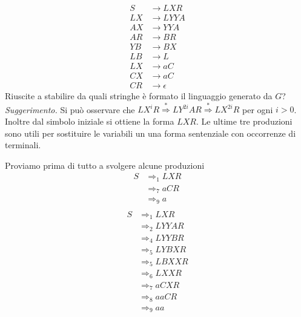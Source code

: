 \documentclass[12pt, answers]{exam}
\newcommand{\der}{\Rightarrow}
\begin{document}
\begin{questions}
	\begin{align}
		S &\rightarrow L X R \\
		L X &\rightarrow L Y Y A \\
		A X &\rightarrow Y Y A \\
		A R &\rightarrow B R \\
		Y B &\rightarrow B X \\
		L B &\rightarrow L \\
		L X &\rightarrow a C \\
		C X &\rightarrow a C \\
		C R &\rightarrow \epsilon
	\end{align}
	Riuscite a stabilire da quali stringhe è formato il linguaggio generato da $G$?
	\textit{Suggerimento.} Si può osservare che $L X^i R \overset{*}{\Rightarrow} LY^{2i} AR \overset{*}{\Rightarrow} LX^{2i} R$ per ogni $i > 0$. Inoltre dal simbolo iniziale si ottiene la forma $LXR$. Le ultime tre produzioni sono utili per sostituire le variabili un una forma sentenziale con occorrenze di terminali.
	\begin{solution}
		Proviamo prima di tutto a svolgere alcune produzioni
		\begin{align*}
			S &\der_1 L X R \\
			  &\der_7 a C R \\
			  &\der_9 a \\
		\end{align*}
		\begin{align*}
			S &\der_1 L X R \\
			  &\der_2 L Y Y A R \\
			  &\der_4 L Y Y B R \\
			  &\der_5 L Y B X R \\
			  &\der_5 L B X X R \\
			  &\der_6 L X X R \\
			  &\der_7 a C X R \\
			  &\der_8 a a C R \\
			  &\der_9 a a \\
		\end{align*}

\end{solution}
\end{questions}
\end{document}
